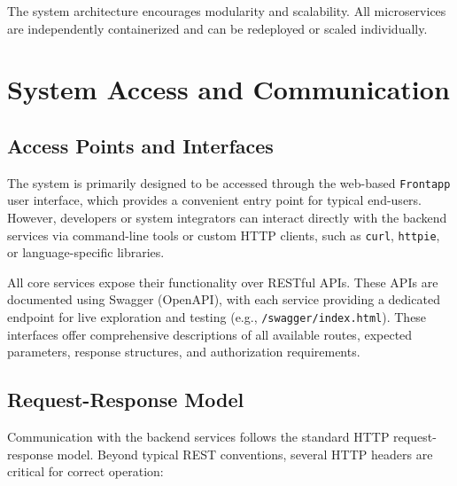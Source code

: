 The system architecture encourages modularity and scalability. All microservices are independently containerized and can be redeployed or scaled individually.




\section{System Access and Communication}
\subsection{Access Points and Interfaces}

The system is primarily designed to be accessed through the web-based \texttt{Frontapp} user interface, 
which provides a convenient entry point for typical end-users. However, developers or system integrators 
can interact directly with the backend services via command-line tools or custom HTTP clients, such as 
\texttt{curl}, \texttt{httpie}, or language-specific libraries.

All core services expose their functionality over RESTful APIs. These APIs are documented using Swagger 
(OpenAPI), with each service providing a dedicated endpoint for live exploration and testing (e.g., 
\texttt{/swagger/index.html}). These interfaces offer comprehensive descriptions of all available routes, 
expected parameters, response structures, and authorization requirements.

\subsection{Request-Response Model}

Communication with the backend services follows the standard HTTP request-response model. Beyond typical 
REST conventions, several HTTP headers are critical for correct operation:

